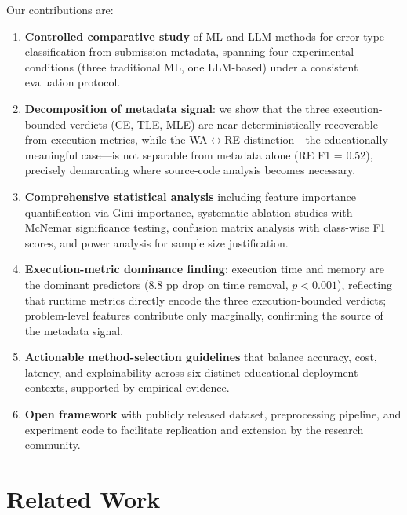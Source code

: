 \documentclass[acmsmall]{acmart}
\begin{document}
Our contributions are:

\begin{enumerate}
    \item \textbf{Controlled comparative study} of ML and LLM methods for error
          type classification from submission metadata, spanning four
          experimental conditions (three traditional ML, one LLM-based) under a
          consistent evaluation protocol.
    \item \textbf{Decomposition of metadata signal}: we show that the three
          execution-bounded verdicts (CE, TLE, MLE) are near-deterministically
          recoverable from execution metrics, while the WA$\leftrightarrow$RE
          distinction---the educationally meaningful case---is not separable
          from metadata alone (RE F1 = 0.52), precisely demarcating where
          source-code analysis becomes necessary.
    \item \textbf{Comprehensive statistical analysis} including feature
          importance quantification via Gini importance, systematic ablation
          studies with McNemar significance testing, confusion matrix analysis
          with class-wise F1 scores, and power analysis for sample size
          justification.
    \item \textbf{Execution-metric dominance finding}: execution time and memory
          are the dominant predictors (8.8 pp drop on time removal, $p < 0.001$),
          reflecting that runtime metrics directly encode the three
          execution-bounded verdicts; problem-level features contribute only
          marginally, confirming the source of the metadata signal.
    \item \textbf{Actionable method-selection guidelines} that balance
          accuracy, cost, latency, and explainability across six distinct
          educational deployment contexts, supported by empirical evidence.
    \item \textbf{Open framework} with publicly released dataset, preprocessing
          pipeline, and experiment code to facilitate replication and
          extension by the research community.
\end{enumerate}

\section{Related Work}
\end{document}
